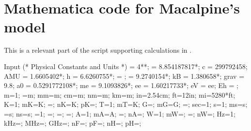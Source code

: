 \chapter{Mathematica code for Macalpine's model}
This is a relevant part of the script supporting calculations in \cite{Leupold2015}.
\begin{mmaCell}[moredefined={c, AMU, h, kB, grav, a0, me, ee, eV, Eh, m, mm, cm, nm, km, in, ft, mi, mK, nK, pK, T, mT, G, mG, sec, s, ms, ns, A, mA, nA, W, mW, nW, Hz, kHz, MHz, GHz, nF, pF, nH, pH}]{Input}
(* Physical Constants and Units *)
 = 4*\mmaDef{\(\pi\)}*;
 = 8.854187817*;
c = 299792458;
AMU = 1.6605402*;
h = 6.6260755*;
\mmaDef{\(\hbar\)} = ;
 = 9.2740154*;
kB = 1.380658*;
grav = 9.8;
a0 = 0.5291772108*;
me = 9.1093826*;
ee = 1.60217733*; eV = ee;
Eh = ;
m=1; =m; mm=m; cm=m; nm=m; km=m;
in=2.54cm; ft=12in; mi=5280*ft;
K=1; mK=K; =; nK=K; pK=;
T=1; mT=K; G=; mG=G; =;
sec=1; s=1; ms=s; =s; ns=s;
\mmaDef{\(\Omega\)}=1; =; =; =;
A=1; mA=A; =; nA=;
W=1; mW=; =; nW=;
Hz=1; kHz=; MHz=; GHz=;
nF=; pF=;
nH=; pH=;
\end{mmaCell}

